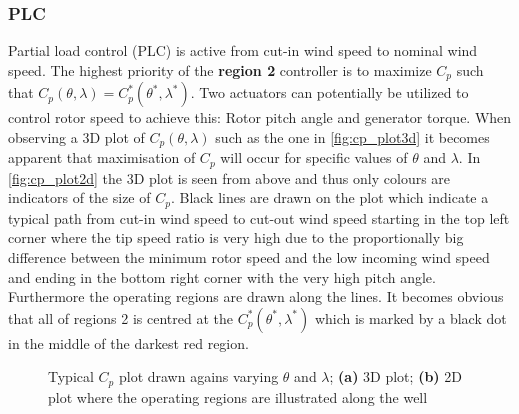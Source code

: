 \subsubsection{PLC}
Partial load control (PLC) is active from cut-in wind speed to nominal wind speed. The highest priority of the \textbf{region 2} controller is to maximize $ C_p $ such that $ C_p(\theta, \lambda) = C_p^*(\theta^*, \lambda^*) $. Two actuators can potentially be utilized to control rotor speed to achieve this: Rotor pitch angle and generator torque. When observing a 3D plot of $ C_p(\theta, \lambda) $ such as the one in \cref{fig:cp_plot3d} it becomes apparent that maximisation of $ C_p $ will occur for specific values of $ \theta $ and $ \lambda $. In \cref{fig:cp_plot2d} the 3D plot is seen from above and thus only colours are indicators of the size of $ C_p $. Black lines are drawn on the plot which indicate a typical path from cut-in wind speed to cut-out wind speed starting in the top left corner where the tip speed ratio is very high due to the proportionally big difference between the minimum rotor speed and the low incoming wind speed and ending in the bottom right corner with the very high pitch angle. Furthermore the operating regions are drawn along the lines. It becomes obvious that all of regions 2 is centred at the $ C_p^*(\theta^*, \lambda^*) $ which is marked by a black dot in the middle of the darkest red region.
\begin{figure}[ht]
	\centering
	
	\hfil
	
	\caption{Typical $ C_p $ plot drawn agains varying $ \theta $ and $ \lambda $; \textbf{(a)} 3D plot; \textbf{(b)} 2D plot where the operating regions are illustrated along the well}
	\label{fig:cp_plot}
\end{figure}
